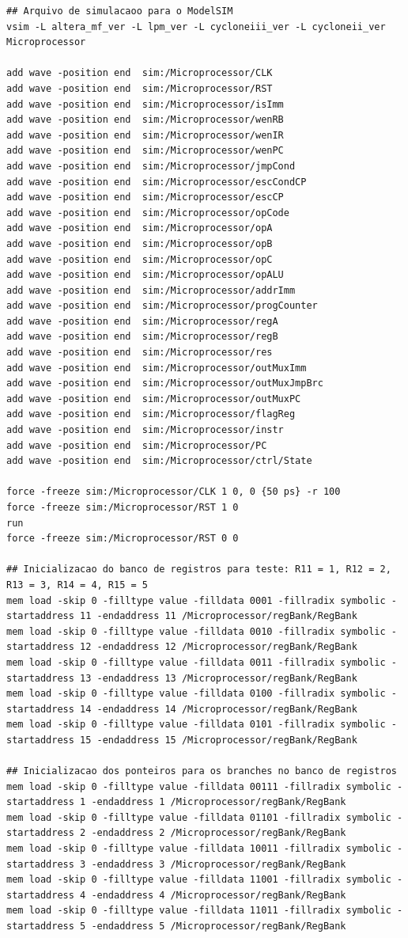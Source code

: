 \documentclass[11pt,a4paper,titlepage]{article}
\begin{document}
\begin{lstlisting}
## Arquivo de simulacaoo para o ModelSIM
vsim -L altera_mf_ver -L lpm_ver -L cycloneiii_ver -L cycloneii_ver Microprocessor

add wave -position end  sim:/Microprocessor/CLK
add wave -position end  sim:/Microprocessor/RST
add wave -position end  sim:/Microprocessor/isImm
add wave -position end  sim:/Microprocessor/wenRB
add wave -position end  sim:/Microprocessor/wenIR
add wave -position end  sim:/Microprocessor/wenPC
add wave -position end  sim:/Microprocessor/jmpCond
add wave -position end  sim:/Microprocessor/escCondCP
add wave -position end  sim:/Microprocessor/escCP
add wave -position end  sim:/Microprocessor/opCode
add wave -position end  sim:/Microprocessor/opA
add wave -position end  sim:/Microprocessor/opB
add wave -position end  sim:/Microprocessor/opC
add wave -position end  sim:/Microprocessor/opALU
add wave -position end  sim:/Microprocessor/addrImm
add wave -position end  sim:/Microprocessor/progCounter
add wave -position end  sim:/Microprocessor/regA
add wave -position end  sim:/Microprocessor/regB
add wave -position end  sim:/Microprocessor/res
add wave -position end  sim:/Microprocessor/outMuxImm
add wave -position end  sim:/Microprocessor/outMuxJmpBrc
add wave -position end  sim:/Microprocessor/outMuxPC
add wave -position end  sim:/Microprocessor/flagReg
add wave -position end  sim:/Microprocessor/instr
add wave -position end  sim:/Microprocessor/PC
add wave -position end  sim:/Microprocessor/ctrl/State

force -freeze sim:/Microprocessor/CLK 1 0, 0 {50 ps} -r 100
force -freeze sim:/Microprocessor/RST 1 0
run
force -freeze sim:/Microprocessor/RST 0 0

## Inicializacao do banco de registros para teste: R11 = 1, R12 = 2, R13 = 3, R14 = 4, R15 = 5
mem load -skip 0 -filltype value -filldata 0001 -fillradix symbolic -startaddress 11 -endaddress 11 /Microprocessor/regBank/RegBank
mem load -skip 0 -filltype value -filldata 0010 -fillradix symbolic -startaddress 12 -endaddress 12 /Microprocessor/regBank/RegBank
mem load -skip 0 -filltype value -filldata 0011 -fillradix symbolic -startaddress 13 -endaddress 13 /Microprocessor/regBank/RegBank
mem load -skip 0 -filltype value -filldata 0100 -fillradix symbolic -startaddress 14 -endaddress 14 /Microprocessor/regBank/RegBank
mem load -skip 0 -filltype value -filldata 0101 -fillradix symbolic -startaddress 15 -endaddress 15 /Microprocessor/regBank/RegBank

## Inicializacao dos ponteiros para os branches no banco de registros
mem load -skip 0 -filltype value -filldata 00111 -fillradix symbolic -startaddress 1 -endaddress 1 /Microprocessor/regBank/RegBank
mem load -skip 0 -filltype value -filldata 01101 -fillradix symbolic -startaddress 2 -endaddress 2 /Microprocessor/regBank/RegBank
mem load -skip 0 -filltype value -filldata 10011 -fillradix symbolic -startaddress 3 -endaddress 3 /Microprocessor/regBank/RegBank
mem load -skip 0 -filltype value -filldata 11001 -fillradix symbolic -startaddress 4 -endaddress 4 /Microprocessor/regBank/RegBank
mem load -skip 0 -filltype value -filldata 11011 -fillradix symbolic -startaddress 5 -endaddress 5 /Microprocessor/regBank/RegBank


\end{lstlisting}
\end{document}
